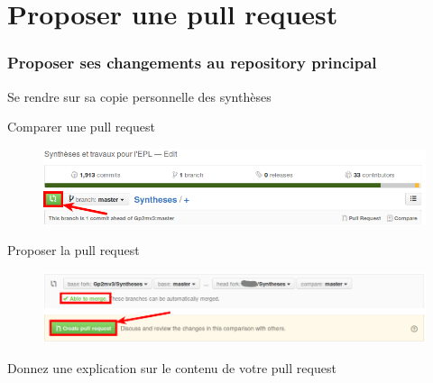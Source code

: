 \documentclass{beamer}
\newenvironment{wideitemize}{\itemize\addtolength{\itemsep}{10pt}}{\enditemize}
\begin{document}
\section{Proposer une pull request}

\begin{frame}
    \frametitle{Proposer ses changements au repository principal}
    \begin{wideitemize}
        \item Se rendre sur sa copie personnelle des synthèses
        \pause
        \item Comparer une pull request
            \begin{figure}[H]
                \centering
                \includegraphics[width=\linewidth]{pull_request.png}
            \end{figure}
         \pause
         \item Proposer la pull request
            \begin{figure}[H]
                \centering
                \includegraphics[width=\linewidth]{create_pull_request.png}
            \end{figure}
         \pause
         \item Donnez une explication sur le contenu de votre pull request
     \end{wideitemize}
\end{frame}
\end{document}
